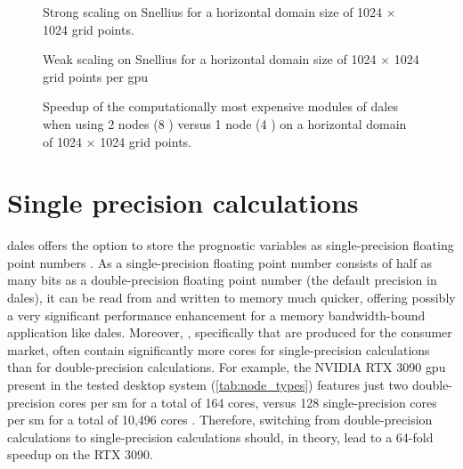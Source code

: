 \begin{figure}[h!]
    \centering
    
    \caption{Strong scaling on Snellius for a horizontal domain size of 1024 $\times$ 1024 grid points.}
    \label{fig:strong_scaling}
\end{figure}

\begin{figure}[h!]
    \centering
    
    \caption{Weak scaling on Snellius for a horizontal domain size of 1024 $\times$ 1024 grid points per \acrshort{gpu}}
    \label{fig:weak_scaling}
\end{figure}

\clearpage

\begin{figure}[h!]
    \centering
    
    \caption{Speedup of the computationally most expensive modules of \acrshort{dales} when using 2 nodes (8 ) versus 1 node (4 )  on a horizontal domain of 1024 $\times$ 1024 grid points.}
    \label{fig:speedup_per_module}
\end{figure}


\section{Single precision calculations}
\acrshort{dales} offers the option to store the prognostic variables as single-precision floating point numbers \citep{janssonCloudBotanyShallow2023}. As a single-precision floating point number consists of half as many bits as a double-precision floating point number (the default precision in \acrshort{dales}), it can be read from and written to memory much quicker, offering possibly a very significant performance enhancement for a memory bandwidth-bound application like \acrshort{dales}. Moreover, , specifically  that are produced for the consumer market, often contain significantly more cores for single-precision calculations than for double-precision calculations. For example, the NVIDIA RTX 3090 \acrshort{gpu} present in the tested desktop system (\autoref{tab:node_types}) features just two double-precision cores per \acrshort{sm} for a total of 164 cores, versus 128 single-precision cores per \acrshort{sm} for a total of 10,496 cores \citep{nvidiaNVIDIAAmpereGA1022021}. Therefore, switching from double-precision calculations to single-precision calculations should, in theory, lead to a 64-fold speedup on the RTX 3090. 

